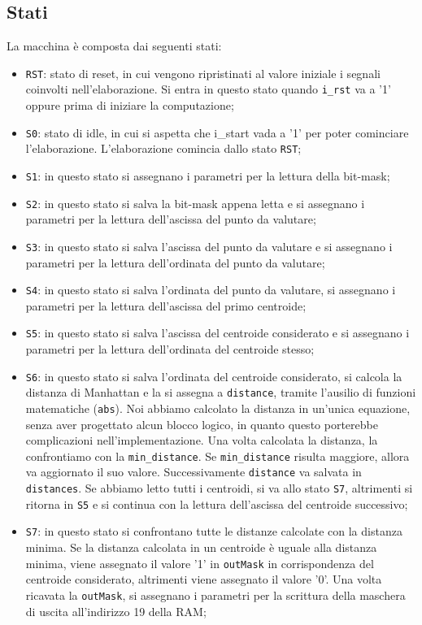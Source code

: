 \documentclass[a4paper,12pt]{article}
\begin{document}
\subsection{Stati}
La macchina è composta dai seguenti stati:
\begin{itemize}
\item \texttt{RST}: stato di reset, in cui vengono ripristinati al valore iniziale i segnali coinvolti nell'elaborazione. Si entra in questo stato quando \texttt{i\_rst} va a '1' oppure prima di iniziare la computazione;
\item \texttt{S0}: stato di idle, in cui si aspetta che i\_start vada a '1' per poter cominciare l'elaborazione. L'elaborazione comincia dallo stato \texttt{RST};
\item \texttt{S1}: in questo stato si assegnano i parametri per la lettura della bit-mask;
\item \texttt{S2}: in questo stato si salva la bit-mask appena letta e si assegnano i parametri per la lettura dell'ascissa del punto da valutare;
\item \texttt{S3}: in questo stato si salva l'ascissa del punto da valutare e si assegnano i parametri per la lettura dell'ordinata del punto da valutare;
\item \texttt{S4}: in questo stato si salva l'ordinata del punto da valutare, si assegnano i parametri per la lettura dell'ascissa del primo centroide;
\item \texttt{S5}: in questo stato si salva l'ascissa del centroide considerato e si assegnano i parametri per la lettura dell'ordinata del centroide stesso;
\item \texttt{S6}: in questo stato si salva l'ordinata del centroide considerato, si calcola la distanza di Manhattan e la si assegna a \texttt{distance}, tramite l'ausilio di funzioni matematiche (\texttt{abs}). Noi abbiamo calcolato la distanza in un'unica equazione, senza aver progettato alcun blocco logico, in quanto questo porterebbe complicazioni nell'implementazione. Una volta calcolata la distanza, la confrontiamo con la \texttt{min\_distance}. Se \texttt{min\_distance} risulta maggiore, allora va aggiornato il suo valore. Successivamente \texttt{distance} va salvata in \texttt{distances}. Se abbiamo letto tutti i centroidi, si va allo stato \texttt{S7}, altrimenti si ritorna in \texttt{S5} e si continua con la lettura dell'ascissa del centroide successivo;
\item \texttt{S7}: in questo stato si confrontano tutte le distanze calcolate con la distanza minima. Se la distanza calcolata in un centroide è uguale alla distanza minima, viene assegnato il valore '1' in \texttt{outMask} in corrispondenza del centroide considerato, altrimenti viene assegnato il valore '0'. Una volta ricavata la \texttt{outMask}, si assegnano i parametri per la scrittura della maschera di uscita all'indirizzo 19 della RAM;

\end{itemize}
\end{document}
